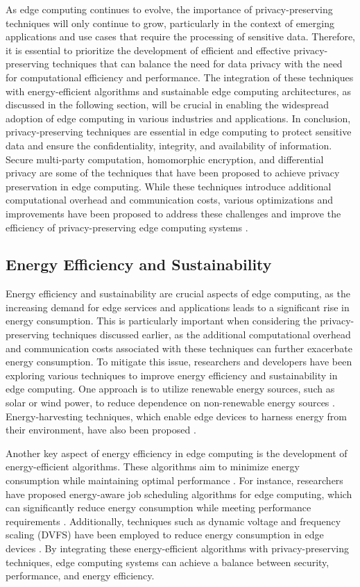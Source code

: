 \documentclass[11pt]{article}
\begin{document}
As edge computing continues to evolve, the importance of privacy-preserving techniques will only continue to grow, particularly in the context of emerging applications and use cases that require the processing of sensitive data. Therefore, it is essential to prioritize the development of efficient and effective privacy-preserving techniques that can balance the need for data privacy with the need for computational efficiency and performance. The integration of these techniques with energy-efficient algorithms and sustainable edge computing architectures, as discussed in the following section, will be crucial in enabling the widespread adoption of edge computing in various industries and applications. In conclusion, privacy-preserving techniques are essential in edge computing to protect sensitive data and ensure the confidentiality, integrity, and availability of information. Secure multi-party computation, homomorphic encryption, and differential privacy are some of the techniques that have been proposed to achieve privacy preservation in edge computing. While these techniques introduce additional computational overhead and communication costs, various optimizations and improvements have been proposed to address these challenges and improve the efficiency of privacy-preserving edge computing systems \cite{ref128}.

\subsection{Energy Efficiency and Sustainability}

Energy efficiency and sustainability are crucial aspects of edge computing, as the increasing demand for edge services and applications leads to a significant rise in energy consumption. This is particularly important when considering the privacy-preserving techniques discussed earlier, as the additional computational overhead and communication costs associated with these techniques can further exacerbate energy consumption. To mitigate this issue, researchers and developers have been exploring various techniques to improve energy efficiency and sustainability in edge computing. One approach is to utilize renewable energy sources, such as solar or wind power, to reduce dependence on non-renewable energy sources \cite{ref51}. Energy-harvesting techniques, which enable edge devices to harness energy from their environment, have also been proposed \cite{ref129}.

Another key aspect of energy efficiency in edge computing is the development of energy-efficient algorithms. These algorithms aim to minimize energy consumption while maintaining optimal performance \cite{ref130}. For instance, researchers have proposed energy-aware job scheduling algorithms for edge computing, which can significantly reduce energy consumption while meeting performance requirements \cite{ref131}. Additionally, techniques such as dynamic voltage and frequency scaling (DVFS) have been employed to reduce energy consumption in edge devices \cite{ref132}. By integrating these energy-efficient algorithms with privacy-preserving techniques, edge computing systems can achieve a balance between security, performance, and energy efficiency.
\end{document}
